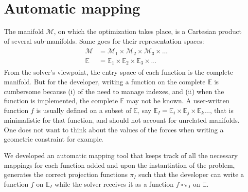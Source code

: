 
\section{Automatic mapping}
\label{sec:automatic_mapping}

The manifold $\mathcal{M}$, on which the optimization takes place, is a Cartesian product of several sub-manifolds. Same goes for their representation spaces:
\begin{align}
  \begin{split}
    \mathcal{M}& = \mathcal{M}_1\times\mathcal{M}_2\times\mathcal{M}_3\times\hdots\\
    \mathbb{E}& = \mathbb{E}_1\times\mathbb{E}_2\times\mathbb{E}_3\times\hdots
  \end{split}
\end{align}
From the solver's viewpoint, the entry space of each function is the complete manifold.
But for the developer, writing a function on the complete $\mathbb{E}$ is cumbersome because (i) of the need to manage indexes, and (ii) when the function is implemented, the complete $\mathbb{E}$ may not be known.
A user-written function $f$ is usually defined on a subset of $\mathbb{E}$, say $\mathbb{E}_I=\mathbb{E}_i\times\mathbb{E}_j\times\mathbb{E}_k\hdots$, that is minimalistic for that function, and should not account for unrelated manifolds.
One does not want to think about the values of the forces when writing a geometric constraint for example.

We developed an automatic mapping tool that keeps track of all the necessary mappings for each function added and upon the instantiation of the problem, generates the correct projection functions $\pi_I$ such that the developer can write a function $f$ on $\mathbb{E}_I$ while the solver receives it as a function $f \circ \pi_I$ on $\mathbb{E}$.

